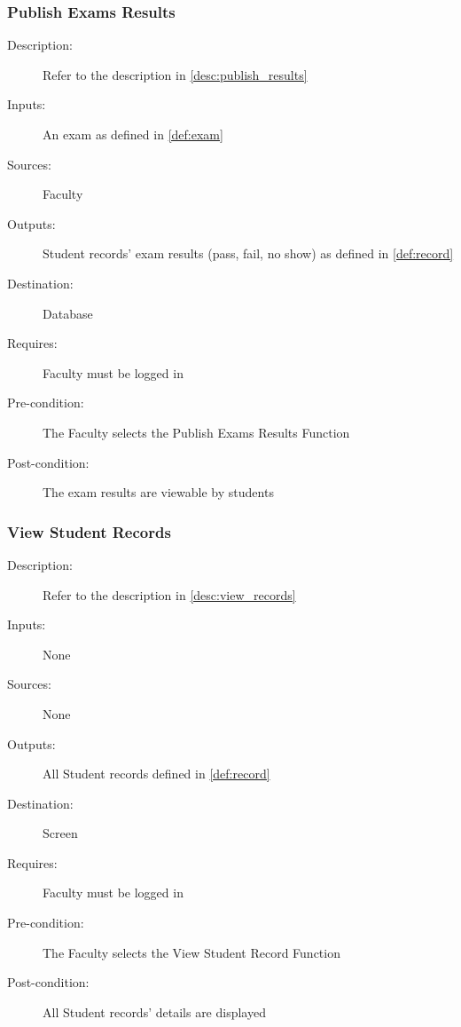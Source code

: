 \subsubsection{\large Publish Exams Results} 
\begin{boxed} %
\begin{description}
\item[Description:]
   Refer to the description in \autoref{desc:publish_results}
\item[Inputs:]
   An exam as defined in \autoref{def:exam}
\item[Sources:]
   Faculty
\item[Outputs:]
   Student records' exam results (pass, fail, no show) as defined in
   \autoref{def:record}
\item[Destination:]
   Database
\item[Requires:]
   Faculty must be logged in
\item[Pre-condition:]
   The Faculty selects the Publish Exams Results Function
\item[Post-condition:]
   The exam results are viewable by students
\end{description}
\end{boxed} %

\subsubsection{\large View Student Records} 
\begin{boxed} %
\begin{description}
\item[Description:]
   Refer to the description in \autoref{desc:view_records}
\item[Inputs:]
   None
\item[Sources:]
   None
\item[Outputs:]
   All Student records defined in \autoref{def:record}
\item[Destination:]
   Screen
\item[Requires:]
   Faculty must be logged in
\item[Pre-condition:]
   The Faculty selects the View Student Record Function
\item[Post-condition:]
   All Student records' details are displayed
\end{description}
\end{boxed} %

